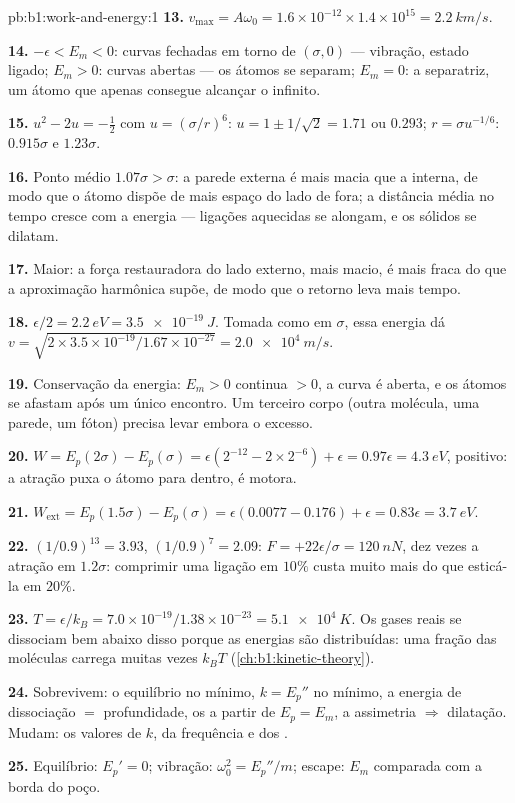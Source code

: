 \begin{solution}{pb:b1:work-and-energy:1}
\textbf{13.} $v_{\max} = A\omega_0 = 1.6\times10^{-12} \times 1.4\times10^{15}
= \qty{2.2}{km/s}$.

\textbf{14.} $-\epsilon < E_m < 0$: curvas fechadas em torno de $(\sigma, 0)$ ---
vibração, estado ligado; $E_m > 0$: curvas abertas --- os átomos se separam;
$E_m = 0$: a separatriz, um átomo que apenas consegue alcançar o infinito.

\textbf{15.} $u^2 - 2u = -\tfrac12$ com $u = (\sigma/r)^6$: $u = 1 \pm 1/\sqrt2
= 1.71$ ou $0.293$; $r = \sigma u^{-1/6}$: $0.915\sigma$ e $1.23\sigma$.

\textbf{16.} Ponto médio $1.07\sigma > \sigma$: a parede externa é mais macia que
a interna, de modo que o átomo dispõe de mais espaço do lado de fora; a
distância média no tempo cresce com a energia --- ligações aquecidas se alongam, e os sólidos se dilatam.

\textbf{17.} Maior: a força restauradora do lado externo, mais macio, é
mais fraca do que a aproximação harmônica supõe, de modo que o retorno leva
mais tempo.

\textbf{18.} $\epsilon/2 = \qty{2.2}{eV} = \qty{3.5e-19}{J}$. Tomada como
 em $\sigma$, essa energia dá
$v = \sqrt{2 \times 3.5\times10^{-19}/1.67\times10^{-27}}
= \qty{2.0e4}{m/s}$.

\textbf{19.} Conservação da energia: $E_m > 0$ continua $> 0$, a curva é
aberta, e os átomos se afastam após um único encontro. Um terceiro corpo (outra
molécula, uma parede, um fóton) precisa levar embora o excesso.

\textbf{20.} $W = E_p(2\sigma) - E_p(\sigma) = \epsilon(2^{-12} - 2 \times 2^{-6})
+ \epsilon = 0.97\epsilon = \qty{4.3}{eV}$, positivo: a atração puxa
o átomo para dentro, é motora.

\textbf{21.} $W_{\text{ext}} = E_p(1.5\sigma) - E_p(\sigma) = \epsilon(0.0077 -
0.176) + \epsilon = 0.83\epsilon = \qty{3.7}{eV}$.

\textbf{22.} $(1/0.9)^{13} = 3.93$, $(1/0.9)^7 = 2.09$: $F = +22\epsilon/\sigma
= \qty{+120}{nN}$, dez vezes a atração em $1.2\sigma$: comprimir uma
ligação em $10\%$ custa muito mais do que esticá-la em $20\%$.

\textbf{23.} $T = \epsilon/k_B = 7.0\times10^{-19}/1.38\times10^{-23} =
\qty{5.1e4}{K}$. Os gases reais se dissociam bem abaixo disso porque as energias são
distribuídas: uma fração das moléculas carrega muitas vezes $k_BT$
(\cref{ch:b1:kinetic-theory}).

\textbf{24.} Sobrevivem: o equilíbrio no mínimo, $k = E_p''$ no
mínimo, a energia de dissociação $=$ profundidade, os  a partir de $E_p = E_m$,
a assimetria $\Rightarrow$ dilatação. Mudam: os valores de $k$, da
frequência e dos .

\textbf{25.} Equilíbrio: $E_p' = 0$; vibração: $\omega_0^2 = E_p''/m$;
escape: $E_m$ comparada com a borda do poço.
\end{solution}
